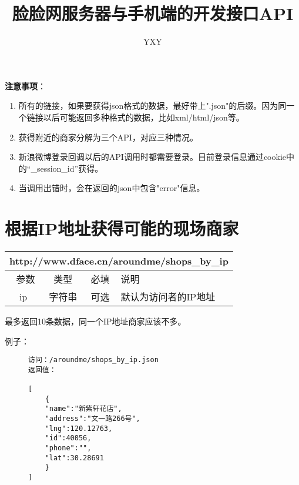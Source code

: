 \documentclass[cs4size]{ctexartutf8}
\author{YXY}
\title{脸脸网服务器与手机端的开发接口API}
\begin{document}
 

\maketitle
\tableofcontents

\newpage

\textbf{注意事项}：
\begin{enumerate}
\item 所有的链接，如果要获得json格式的数据，最好带上".json"的后缀。因为同一个链接以后可能返回多种格式的数据，比如xml/html/json等。
\item 获得附近的商家分解为三个API，对应三种情况。
\item 新浪微博登录回调以后的API调用时都需要登录。目前登录信息通过cookie中的“\_session\_id”获得。
\item 当调用出错时，会在返回的json中包含"error"信息。
\end{enumerate}

\newpage


\section{根据IP地址获得可能的现场商家}

\begin{table}[H]
   \begin{center}
\begin{tabular}{|c|c|c|p{12cm}|}
\hline
\multicolumn{4}{|c|}{http://www.dface.cn/aroundme/shops\_by\_ip} \\
\hline\hline
 \  参数  & 类型 & 必填 &  说明  \\
\hline
 ip  & 字符串 & 可选 & 默认为访问者的IP地址\\
\hline
\end{tabular}
   \end{center}
\end{table}


最多返回10条数据，同一个IP地址商家应该不多。

例子：

\begin{figure}[H]
\begin{verbatim}
访问：/aroundme/shops_by_ip.json
返回值：

[
	{
	"name":"新紫轩花店",
	"address":"文一路266号",
	"lng":120.12763,
	"id":40056,
	"phone":"",
	"lat":30.28691
	}
]

\end{verbatim}
\end{figure}
\end{document}

